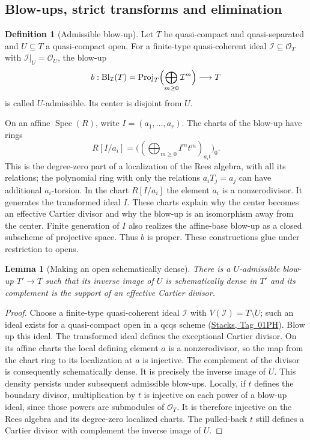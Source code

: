 \documentclass[11pt,a4paper]{article}
\numberwithin{equation}{section}
\newtheorem{lemma}[theorem]{Lemma}
\theoremstyle{definition}
\newtheorem{definition}[theorem]{Definition}
\theoremstyle{remark}
\newcommand{\stacks}[1]{\href{https://stacks.math.columbia.edu/tag/#1}{\textnormal{Stacks, Tag~#1}}}
\begin{document}
\subsection{Blow-ups, strict transforms and elimination}
\label{app:nagata-blowups}

\begin{definition}[Admissible blow-up]
\label{app:nagata-admissible}
Let $T$ be quasi-compact and quasi-separated and $U\subseteq T$ a
quasi-compact open. For a finite-type quasi-coherent ideal
$\mathcal I\subseteq\mathcal O_T$ with
$\mathcal I|_U=\mathcal O_U$, the blow-up
\[
 b:\operatorname{Bl}_{\mathcal I}(T)=
 \operatorname{Proj}_T\Bigl(\bigoplus_{m\geq0}\mathcal I^m\Bigr)
 \longrightarrow T
\]
is called $U$-admissible. Its center is disjoint from $U$.
\end{definition}

On an affine $\operatorname{Spec}(R)$, write
$I=(a_1,\ldots,a_r)$. The charts of the blow-up have rings
\[
 R[I/a_i]=\bigl((\bigoplus_{m\geq0}I^mt^m)_{a_it}\bigr)_0.
\]
This is the degree-zero part of a localization of the Rees algebra,
with all its relations; the polynomial ring with only the relations
$a_iT_j=a_j$ can have additional $a_i$-torsion. In the chart $R[I/a_i]$
the element $a_i$ is a nonzerodivisor. It generates the transformed ideal $I$.
These charts explain why the center becomes an effective Cartier
divisor and why the blow-up is an isomorphism away from the center.
Finite generation of $I$ also realizes the affine-base blow-up as a
closed subscheme of projective space. Thus $b$ is proper. These
constructions glue under restriction to opens.

\begin{lemma}[Making an open schematically dense]
\label{app:nagata-boundary-divisor}
There is a $U$-admissible blow-up $T'\to T$ such that its inverse
image of $U$ is schematically dense in $T'$ and its complement is
the support of an effective Cartier divisor.
\end{lemma}

\begin{proof}
Choose a finite-type quasi-coherent ideal $\mathcal I$ with
$V(\mathcal I)=T\setminus U$; such an ideal exists for a
quasi-compact open in a qcqs scheme (\stacks{01PH}). Blow up this
ideal. The transformed ideal defines the exceptional Cartier divisor.
On its affine charts the local defining element $a$ is a
nonzerodivisor, so the map from the chart ring to its localization at
$a$ is injective. The complement of the divisor is consequently
schematically dense. It is precisely the inverse image of $U$.
This density persists under subsequent admissible blow-ups. Locally,
if $t$ defines the boundary divisor, multiplication by $t$ is injective
on each power of a blow-up ideal, since those powers are submodules of
$\mathcal O_T$. It is therefore injective on the Rees algebra and
its degree-zero localized charts. The pulled-back $t$ still defines
a Cartier divisor with complement the inverse image of $U$.
\end{proof}
\end{document}
